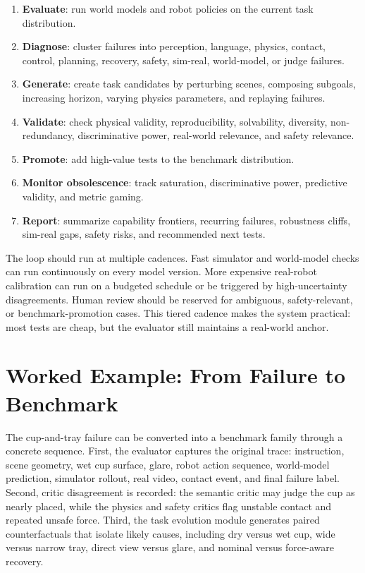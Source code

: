 \documentclass[sigconf,review,anonymous]{acmart}
\begin{document}
\begin{enumerate}[leftmargin=*]
  \item \textbf{Evaluate}: run world models and robot policies on the current task distribution.
  \item \textbf{Diagnose}: cluster failures into perception, language, physics, contact, control, planning, recovery, safety, sim-real, world-model, or judge failures.
  \item \textbf{Generate}: create task candidates by perturbing scenes, composing subgoals, increasing horizon, varying physics parameters, and replaying failures.
  \item \textbf{Validate}: check physical validity, reproducibility, solvability, diversity, non-redundancy, discriminative power, real-world relevance, and safety relevance.
  \item \textbf{Promote}: add high-value tests to the benchmark distribution.
  \item \textbf{Monitor obsolescence}: track saturation, discriminative power, predictive validity, and metric gaming.
  \item \textbf{Report}: summarize capability frontiers, recurring failures, robustness cliffs, sim-real gaps, safety risks, and recommended next tests.
\end{enumerate}

The loop should run at multiple cadences. Fast simulator and world-model checks can run continuously on every model version. More expensive real-robot calibration can run on a budgeted schedule or be triggered by high-uncertainty disagreements. Human review should be reserved for ambiguous, safety-relevant, or benchmark-promotion cases. This tiered cadence makes the system practical: most tests are cheap, but the evaluator still maintains a real-world anchor.

\section{Worked Example: From Failure to Benchmark}

The cup-and-tray failure can be converted into a benchmark family through a concrete sequence. First, the evaluator captures the original trace: instruction, scene geometry, wet cup surface, glare, robot action sequence, world-model prediction, simulator rollout, real video, contact event, and final failure label. Second, critic disagreement is recorded: the semantic critic may judge the cup as nearly placed, while the physics and safety critics flag unstable contact and repeated unsafe force. Third, the task evolution module generates paired counterfactuals that isolate likely causes, including dry versus wet cup, wide versus narrow tray, direct view versus glare, and nominal versus force-aware recovery.
\end{document}
